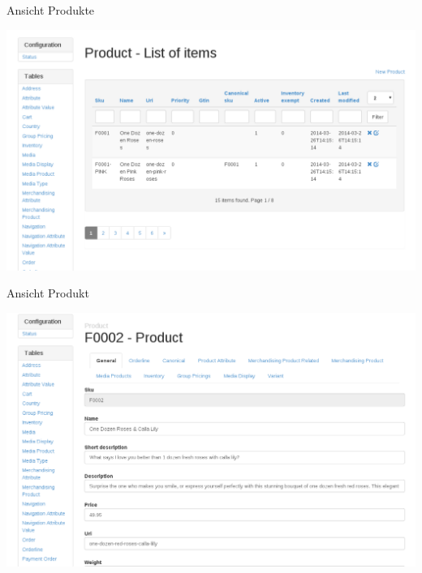 \begin{frame}{Ansicht Produkte}
  \begin{center}
    \includegraphics[width=\textwidth,height=0.8\textheight,keepaspectratio]{images/product.png}
  \end{center}
\end{frame}

\begin{frame}{Ansicht Produkt}
  \begin{center}
    \includegraphics[width=\textwidth,height=0.8\textheight,keepaspectratio]{images/product-detail.png}
  \end{center}
\end{frame}

